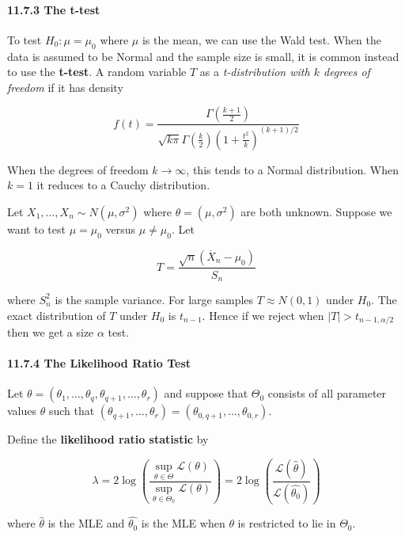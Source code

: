 \paragraph{11.7.3 The t-test}\label{the-t-test}

To test \(H_{0}: \mu = \mu_{0}\) where \(\mu\) is the mean, we can use the
Wald test. When the data is assumed to be Normal and the sample size is
small, it is common instead to use the \textbf{t-test}. A random
variable \(T\) as a \emph{t-distribution with \(k\) degrees of freedom}
if it has density

\[ f(t) = \frac{\Gamma\left(\frac{k+1}{2}\right)}{\sqrt{k \pi} \Gamma\left(\frac{k}{2}\right) \left(1 + \frac{t^{2}}{k}\right)^{(k+1)/2}}\]

When the degrees of freedom \(k \rightarrow \infty\), this tends to a
Normal distribution. When \(k = 1\) it reduces to a Cauchy distribution.

Let \(X_{1}, \dots, X_{n} \sim N(\mu, \sigma^{2})\) where
\(\theta = (\mu, \sigma^{2})\) are both unknown. Suppose we want to test
\(\mu = \mu_{0}\) versus \(\mu \neq \mu_{0}\). Let

\[T = \frac{\sqrt{n}(\overline{X}_{n} - \mu_{0})}{S_{n}}\]

where \(S_{n}^{2}\) is the sample variance. For large samples
\(T \approx N(0, 1)\) under \(H_{0}\). The exact distribution of \(T\)
under \(H_{0}\) is \(t_{n-1}\). Hence if we reject when
\(|T| > t_{n-1, \alpha/2}\) then we get a size \(\alpha\) test.

\paragraph{11.7.4 The Likelihood Ratio
Test}\label{the-likelihood-ratio-test}

Let
\(\theta = (\theta_{1}, \dots, \theta_q, \theta_{q+1}, \dots, \theta_r)\)
and suppose that \(\Theta_{0}\) consists of all parameter values
\(\theta\) such that
\((\theta_{q+1}, \dots, \theta_r) = (\theta_{0, q+1}, \dots, \theta_{0, r})\).

Define the \textbf{likelihood ratio statistic} by

\[ \lambda 
= 2 \log \left(  \frac{\sup_{\theta \in \Theta} \mathcal{L}(\theta)}{\sup_{\theta \in \Theta_{0}} \mathcal{L}(\theta)} \right) 
= 2 \log \left(  \frac{\mathcal{L}(\hat{\theta})}{\mathcal{L}(\hat{\theta_{0}})} \right) \]

where \(\hat{\theta}\) is the MLE and \(\hat{\theta_{0}}\) is the MLE when
\(\theta\) is restricted to lie in \(\Theta_{0}\).

